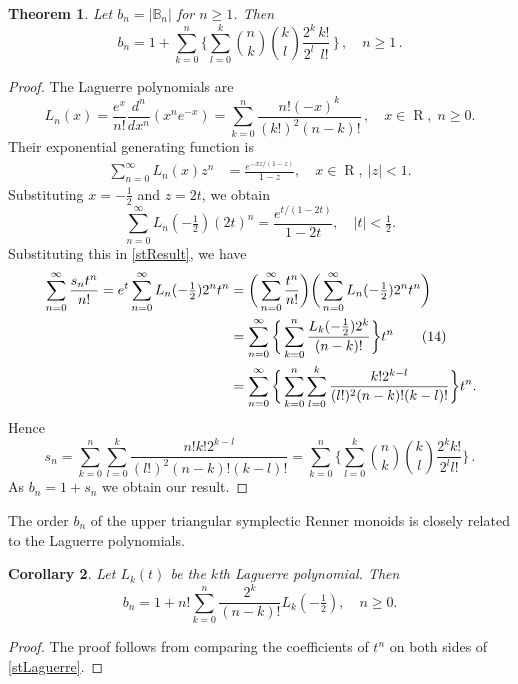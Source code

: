 \documentclass[11pt]{article}
\newtheorem{theorem}{Theorem}[section]
\newtheorem{corollary}[theorem]{Corollary}
\newcommand{\q}{\quad}
\newcommand{\ges}{\geqslant}
\DeclareMathOperator{\R}{R}
\begin{document}
\begin{theorem} {\label{formula:bn}}
Let $b_n=|\mathbb B_n|$ for $n\ges 1$. Then
\[
b_n=1+\sum_{k=0}^n\Bigg\{\sum_{l=0}^k\binom{n}{k}
\binom{k}{l}\frac{ 2^k\,k!}{2^l\,\;l!}\,\Bigg\}\,,\q n\ges 1\,.
\]
\end{theorem}
\begin{proof}
  The Laguerre polynomials are 
\[
L_n(x)=\frac{e^x}{n!}\frac{d^n}{dx^n}(x^ne^{-x})=\sum_{k=0}^n\frac{n!(-x)^k}{(k!)^2(n-k)!}
\,,\q x\in\R,\; n\ges 0.
\]
Their exponential generating function is
\begin{align*}
\sum_{n=0}^\infty L_n(x)z^n&=\frac{e^{-xz/(1-z)}}{1-z},\q x\in\R,~ |z|<1.
\end{align*}
Substituting $x=-\frac12$ and $z=2t$, we obtain
\[
\sum_{n=0}^\infty L_n(-\tfrac12)(2t)^n=\frac{e^{t/(1-2t)}}{1-2t},\q|t|<\tfrac12.
\]
Substituting this in \eqref{stResult}, we have
\begin{align*}{\label{stLaguerre}}
\sum_{n=0}^\infty \frac{s_nt^n}{n!}=e^t\sum_{n=0}^\infty L_n(-\tfrac12)2^nt^n
&= \bigg( \sum_{n=0}^\infty\frac{t^n}{n!}\bigg)\bigg( \sum_{n=0}^\infty L_n(-\tfrac12)2^nt^n\bigg)\\
&=\sum_{n=0}^\infty \bigg\{\sum_{k=0}^n \frac{L_k(-\tfrac12)2^k}{(n-k)!}\bigg\} t^n \tag{14} \\
&=\sum_{n=0}^\infty \bigg\{\sum_{k=0}^n\sum_{l=0}^k\frac{k!2^{k-l}}{(l!)^2(n-k)!(k-l)!}  \bigg\}  t^n.
\end{align*}
Hence 
\[
s_n=
\sum_{k=0}^n\sum_{l=0}^k\frac{n!k!2^{k-l}}{(l!)^2(n-k)!(k-l)!}   
=\sum_{k=0}^n\bigg\{\sum_{l=0}^k\binom{n}{k}\binom{k}{l}\frac{2^k k!}{2^ll!}\bigg\}\,.
\]
As $b_n=1+s_n$ we obtain our result.
\end{proof}

The order $b_n$ of the upper triangular symplectic Renner monoids is closely related to the Laguerre polynomials.
\begin{corollary}{\label{coro:LaguerrePolynomial}}
Let $L_k(t)$ be the $k$th Laguerre polynomial. Then
$$
    b_n = 1+n!\sum_{k=0}^n\frac{2^k}{(n-k)!}L_k\left(-\tfrac12\right),\q n\ges 0.
$$
\end{corollary}
\begin{proof}
  The proof follows from comparing the coefficients of $t^n$ on both sides of \eqref{stLaguerre}.
\end{proof}
\end{document}
